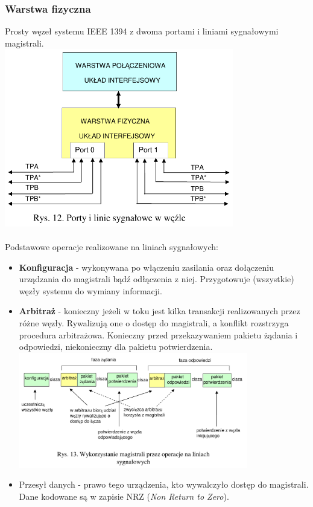 	\subsubsection{Warstwa fizyczna}
	Prosty węzeł systemu IEEE 1394 z dwoma portami i liniami sygnałowymi magistrali.\\
	\includegraphics[width=10cm]{./wyklady/FIREWIRE_15_1.pdf}\\\\
	Podstawowe operacje realizowane na liniach sygnałowych:
	\begin{itemize}
		\item \textbf{Konfiguracja} - wykonywana po włączeniu zasilania oraz dołączeniu urządzania do magistrali bądź odłączenia z niej. Przygotowuje (wszystkie) węzły systemu do wymiany informacji.
		\item \textbf{Arbitraż} - konieczny jeżeli w toku jest kilka transakcji realizowanych przez różne węzły. Rywalizują one o dostęp do magistrali, a konflikt rozstrzyga procedura arbitrażowa. Konieczny przed przekazywaniem pakietu żądania i odpowiedzi, niekonieczny dla pakietu potwierdzenia.\\
		\includegraphics[width=10cm]{./wyklady/FIREWIRE_15_2.pdf}
		\item Przesył danych - prawo tego urządzenia, kto wywalczyło dostęp do magistrali. Dane kodowane są w zapisie NRZ (\emph{Non Return to Zero}).
	\end{itemize}
